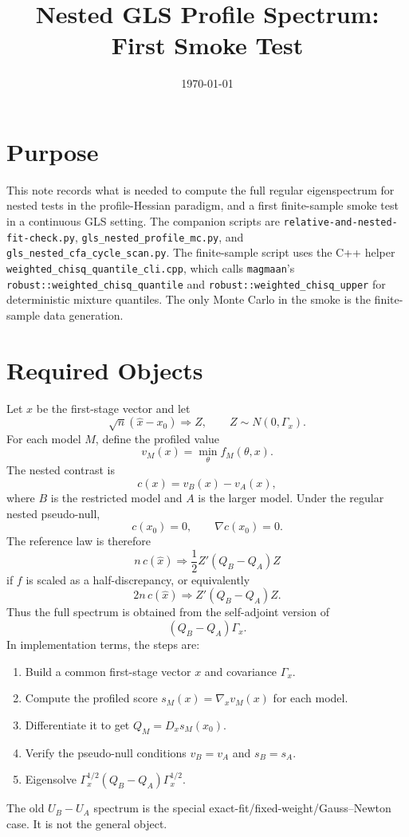 \documentclass[11pt]{article}
\title{Nested GLS Profile Spectrum: First Smoke Test}
\author{}
\date{\today}
\begin{document}
\maketitle

\section*{Purpose}

This note records what is needed to compute the full regular eigenspectrum for
nested tests in the profile-Hessian paradigm, and a first finite-sample smoke
test in a continuous GLS setting. The companion scripts are
\texttt{relative-and-nested-fit-check.py}, \texttt{gls\_nested\_profile\_mc.py},
and \texttt{gls\_nested\_cfa\_cycle\_scan.py}.
The finite-sample script uses the C++ helper
\texttt{weighted\_chisq\_quantile\_cli.cpp}, which calls \texttt{magmaan}'s
\texttt{robust::weighted\_chisq\_quantile} and
\texttt{robust::weighted\_chisq\_upper} for deterministic mixture quantiles. The
only Monte Carlo in the smoke is the finite-sample data generation.

\section{Required Objects}

Let $x$ be the first-stage vector and let
\[
  \sqrt n(\hat x-x_0)\Rightarrow Z,\qquad Z\sim N(0,\Gamma_x).
\]
For each model $M$, define the profiled value
\[
  v_M(x)=\min_\theta f_M(\theta,x).
\]
The nested contrast is
\[
  c(x)=v_B(x)-v_A(x),
\]
where $B$ is the restricted model and $A$ is the larger model. Under the regular
nested pseudo-null,
\[
  c(x_0)=0,\qquad \nabla c(x_0)=0.
\]
The reference law is therefore
\[
  n\,c(\hat x)\Rightarrow \frac12 Z'(Q_B-Q_A)Z
\]
if $f$ is scaled as a half-discrepancy, or equivalently
\[
  2n\,c(\hat x)\Rightarrow Z'(Q_B-Q_A)Z.
\]
Thus the full spectrum is obtained from the self-adjoint version of
\[
  (Q_B-Q_A)\Gamma_x .
\]
In implementation terms, the steps are:
\begin{enumerate}
\item Build a common first-stage vector $x$ and covariance $\Gamma_x$.
\item Compute the profiled score $s_M(x)=\nabla_x v_M(x)$ for each model.
\item Differentiate it to get $Q_M=D_xs_M(x_0)$.
\item Verify the pseudo-null conditions $v_B=v_A$ and $s_B=s_A$.
\item Eigensolve $\Gamma_x^{1/2}(Q_B-Q_A)\Gamma_x^{1/2}$.
\end{enumerate}
The old $U_B-U_A$ spectrum is the special exact-fit/fixed-weight/Gauss--Newton
case. It is not the general object.
\end{document}
